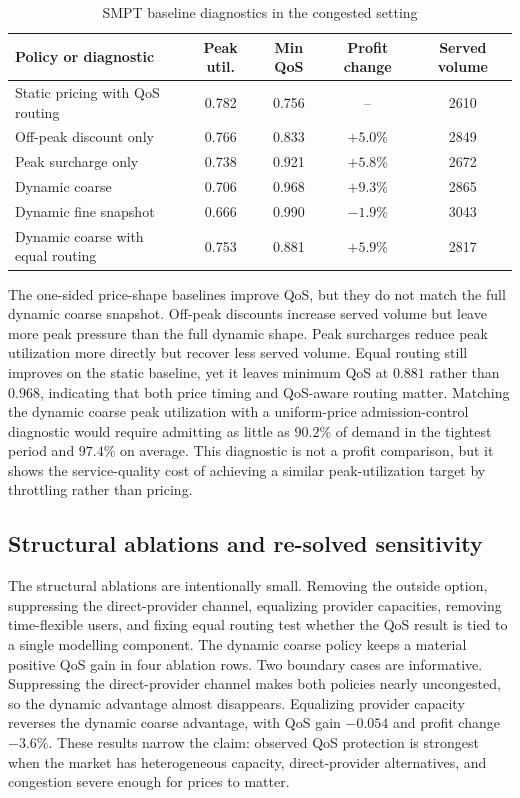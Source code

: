 \documentclass[11pt,a4paper]{article}
\begin{document}
\begin{table}[H]
\centering
\caption{SMPT baseline diagnostics in the congested setting}
\label{tab:smpt_baselines}
\small
\begin{tabular}{lcccc}
\toprule
Policy or diagnostic & Peak util. & Min QoS & Profit change & Served volume \\
\midrule
Static pricing with QoS routing & 0.782 & 0.756 & -- & 2610 \\
Off-peak discount only & 0.766 & 0.833 & $+5.0\%$ & 2849 \\
Peak surcharge only & 0.738 & 0.921 & $+5.8\%$ & 2672 \\
Dynamic coarse & 0.706 & 0.968 & $+9.3\%$ & 2865 \\
Dynamic fine snapshot & 0.666 & 0.990 & $-1.9\%$ & 3043 \\
Dynamic coarse with equal routing & 0.753 & 0.881 & $+5.9\%$ & 2817 \\
\bottomrule
\end{tabular}
\end{table}

The one-sided price-shape baselines improve QoS, but they do not match the full dynamic coarse snapshot. Off-peak discounts increase served volume but leave more peak pressure than the full dynamic shape. Peak surcharges reduce peak utilization more directly but recover less served volume. Equal routing still improves on the static baseline, yet it leaves minimum QoS at $0.881$ rather than $0.968$, indicating that both price timing and QoS-aware routing matter. Matching the dynamic coarse peak utilization with a uniform-price admission-control diagnostic would require admitting as little as $90.2\%$ of demand in the tightest period and $97.4\%$ on average. This diagnostic is not a profit comparison, but it shows the service-quality cost of achieving a similar peak-utilization target by throttling rather than pricing.

\subsection{Structural ablations and re-solved sensitivity}

The structural ablations are intentionally small. Removing the outside option, suppressing the direct-provider channel, equalizing provider capacities, removing time-flexible users, and fixing equal routing test whether the QoS result is tied to a single modelling component. The dynamic coarse policy keeps a material positive QoS gain in four ablation rows. Two boundary cases are informative. Suppressing the direct-provider channel makes both policies nearly uncongested, so the dynamic advantage almost disappears. Equalizing provider capacity reverses the dynamic coarse advantage, with QoS gain $-0.054$ and profit change $-3.6\%$. These results narrow the claim: observed QoS protection is strongest when the market has heterogeneous capacity, direct-provider alternatives, and congestion severe enough for prices to matter.
\end{document}
